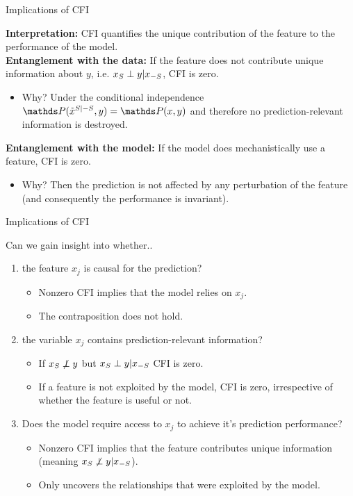\documentclass[11pt,compress,t,notes=noshow, aspectratio=169, xcolor=table]{beamer}
\begin{document}
\begin{vbframe}{Implications of CFI }

\textbf{Interpretation:} CFI quantifies the unique contribution of the feature to the performance of the model.\\
\lz
\textbf{Entanglement with the data:} If the feature does not contribute unique information about $y$, i.e. $x_S \indep y | x_{-S}$, CFI is zero.\\
\begin{itemize}
  \item Why? Under the conditional independence $\P(\pert{x}{S}{-S}, y) = \P(x,y)$ and therefore no prediction-relevant information is destroyed.
\end{itemize}
\lz
\textbf{Entanglement with the model:} If the model does mechanistically use a feature, CFI is zero.\\
\begin{itemize}
  \item Why? Then the prediction is not affected by any perturbation of the feature (and consequently the performance is invariant).
\end{itemize}

\end{vbframe}


\begin{vbframe}{Implications of CFI}

Can we gain insight into whether..

\begin{enumerate}
    \item the feature $x_j$ is causal for the prediction?
    \begin{itemize}
      \item Nonzero CFI implies that the model relies on $x_j$.
      \item The contraposition does not hold.
    \end{itemize}
    \item the variable $x_j$ contains prediction-relevant information?
    \begin{itemize}
      \item If $x_S \not \indep y$ but $x_S \indep y | x_{-S}$ CFI is zero.
      \item If a feature is not exploited by the model, CFI is zero, irrespective of whether the feature is useful or not.
    \end{itemize}
    \item Does the model require access to $x_j$ to achieve it's prediction performance?
\begin{itemize}
      \item Nonzero CFI implies that the feature contributes unique information (meaning $x_S \not \indep y | x_{-S}$).
      \item Only uncovers the relationships that were exploited by the model.
    \end{itemize}
\end{enumerate}
\end{vbframe}
\end{document}
